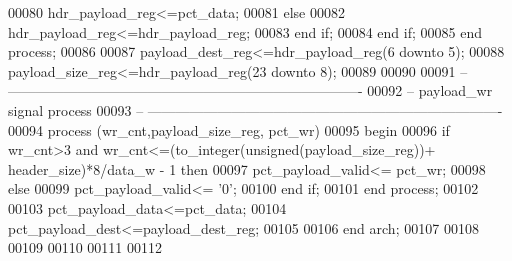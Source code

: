 \begin{DoxyCode}
00080                 \textcolor{vhdlchar}{hdr_payload_reg}\textcolor{vhdlchar}{<=}\textcolor{vhdlchar}{pct_data};
00081             \textcolor{keywordflow}{else} 
00082                 \textcolor{vhdlchar}{hdr_payload_reg}\textcolor{vhdlchar}{<=}\textcolor{vhdlchar}{hdr_payload_reg};
00083             \textcolor{keywordflow}{end} \textcolor{keywordflow}{if};
00084         \textcolor{keywordflow}{end} \textcolor{keywordflow}{if};
00085     \textcolor{keywordflow}{end} \textcolor{keywordflow}{process};
00086 
00087 \textcolor{vhdlchar}{payload_dest_reg}\textcolor{vhdlchar}{<=}\textcolor{vhdlchar}{hdr_payload_reg}\textcolor{vhdlchar}{(}\textcolor{vhdllogic}{}\textcolor{vhdllogic}{6} \textcolor{keywordflow}{downto} \textcolor{vhdllogic}{}\textcolor{vhdllogic}{5}\textcolor{vhdlchar}{)};
00088 \textcolor{vhdlchar}{payload_size_reg}\textcolor{vhdlchar}{<=}\textcolor{vhdlchar}{hdr_payload_reg}\textcolor{vhdlchar}{(}\textcolor{vhdllogic}{}\textcolor{vhdllogic}{23} \textcolor{keywordflow}{downto} \textcolor{vhdllogic}{}\textcolor{vhdllogic}{8}\textcolor{vhdlchar}{)};
00089 
00090 
00091 \textcolor{keyword}{-- ----------------------------------------------------------------------------}
00092 \textcolor{keyword}{-- payload\_wr signal process}
00093 \textcolor{keyword}{-- ----------------------------------------------------------------------------}
00094 \textcolor{keywordflow}{process} (wr_cnt,payload_size_reg, pct_wr)
00095 \textcolor{vhdlkeyword}{begin }
00096         \textcolor{keywordflow}{if} \textcolor{vhdlchar}{wr_cnt}\textcolor{vhdlchar}{>}\textcolor{vhdllogic}{}\textcolor{vhdllogic}{3} \textcolor{keywordflow}{and} \textcolor{vhdlchar}{wr_cnt}\textcolor{vhdlchar}{<=}\textcolor{vhdlchar}{(}\textcolor{vhdlchar}{to\_integer}\textcolor{vhdlchar}{(}\textcolor{comment}{unsigned}\textcolor{vhdlchar}{(}\textcolor{vhdlchar}{payload_size_reg}\textcolor{vhdlchar}{)}\textcolor{vhdlchar}{)}\textcolor{vhdlchar}{+}\textcolor{vhdlchar}{
      header_size}\textcolor{vhdlchar}{)}\textcolor{vhdlchar}{*}\textcolor{vhdllogic}{}\textcolor{vhdllogic}{8}\textcolor{vhdlchar}{/}\textcolor{vhdlchar}{data_w} \textcolor{vhdlchar}{-} \textcolor{vhdllogic}{}\textcolor{vhdllogic}{1} \textcolor{keywordflow}{then} 
00097             \textcolor{vhdlchar}{pct_payload_valid}\textcolor{vhdlchar}{<=} \textcolor{vhdlchar}{pct_wr};
00098         \textcolor{keywordflow}{else} 
00099             \textcolor{vhdlchar}{pct_payload_valid}\textcolor{vhdlchar}{<=} \textcolor{vhdlchar}{'}\textcolor{vhdllogic}{}\textcolor{vhdllogic}{0}\textcolor{vhdlchar}{'};
00100         \textcolor{keywordflow}{end} \textcolor{keywordflow}{if};      
00101 \textcolor{keywordflow}{end} \textcolor{keywordflow}{process};
00102 
00103 \textcolor{vhdlchar}{pct_payload_data}\textcolor{vhdlchar}{<=}\textcolor{vhdlchar}{pct_data};
00104 \textcolor{vhdlchar}{pct_payload_dest}\textcolor{vhdlchar}{<=}\textcolor{vhdlchar}{payload_dest_reg};
00105 
00106 \textcolor{keywordflow}{end} \textcolor{vhdlchar}{arch};   
00107 
00108 
00109 
00110 
00111 
00112 
\end{DoxyCode}
